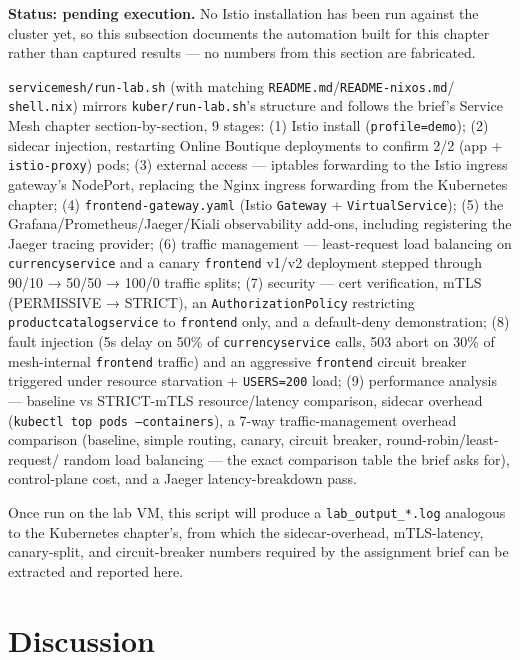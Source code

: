 \documentclass[a4paper,11pt]{article}
\begin{document}
\textbf{Status: pending execution.} No Istio installation has been run against the cluster yet, so
this subsection documents the automation built for this chapter rather than captured results — no
numbers from this section are fabricated.

\texttt{servicemesh/run-lab.sh} (with matching \texttt{README.md}/\texttt{README-nixos.md}/
\texttt{shell.nix}) mirrors \texttt{kuber/run-lab.sh}'s structure and follows the brief's Service
Mesh chapter section-by-section, 9 stages: (1) Istio install (\texttt{profile=demo}); (2) sidecar
injection, restarting Online Boutique deployments to confirm 2/2 (app + \texttt{istio-proxy}) pods;
(3) external access — iptables forwarding to the Istio ingress gateway's NodePort, replacing the
Nginx ingress forwarding from the Kubernetes chapter; (4) \texttt{frontend-gateway.yaml} (Istio
\texttt{Gateway} + \texttt{VirtualService}); (5) the Grafana/Prometheus/Jaeger/Kiali observability
add-ons, including registering the Jaeger tracing provider; (6) traffic management — least-request
load balancing on \texttt{currencyservice} and a canary \texttt{frontend} v1/v2 deployment stepped
through 90/10 → 50/50 → 100/0 traffic splits; (7) security — cert verification, mTLS
(PERMISSIVE → STRICT), an \texttt{AuthorizationPolicy} restricting \texttt{productcatalogservice}
to \texttt{frontend} only, and a default-deny demonstration; (8) fault injection (5s delay on 50\%
of \texttt{currencyservice} calls, 503 abort on 30\% of mesh-internal \texttt{frontend} traffic)
and an aggressive \texttt{frontend} circuit breaker triggered under resource starvation +
\texttt{USERS=200} load; (9) performance analysis — baseline vs STRICT-mTLS resource/latency
comparison, sidecar overhead (\texttt{kubectl top pods --containers}), a 7-way traffic-management
overhead comparison (baseline, simple routing, canary, circuit breaker, round-robin/least-request/
random load balancing — the exact comparison table the brief asks for), control-plane cost, and a
Jaeger latency-breakdown pass.

Once run on the lab VM, this script will produce a \texttt{lab\_output\_*.log} analogous to the
Kubernetes chapter's, from which the sidecar-overhead, mTLS-latency, canary-split, and
circuit-breaker numbers required by the assignment brief can be extracted and reported here.

\section{Discussion}
\end{document}
